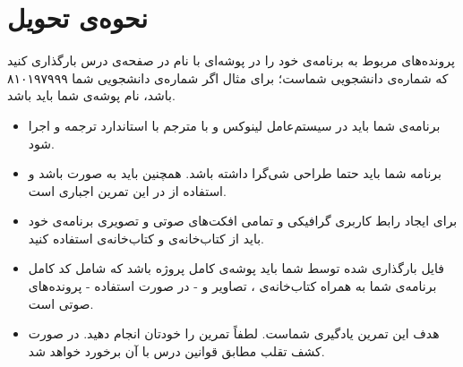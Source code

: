 \documentclass{utap}
\begin{document}
\section{نحوه‌ی تحویل}
    پرونده‌‌های مربوط به برنامه‌ی خود را در پوشه‌ای با نام  در صفحه‌ی  درس بارگذاری کنید که  شماره‌ی دانشجویی شماست؛ برای مثال اگر شماره‌ی دانشجویی شما ۸۱۰۱۹۷۹۹۹ باشد، نام پوشه‌ی شما باید  باشد.
    \begin{itemize}
        \item
برنامه‌ی شما باید در سیستم‌عامل لینوکس و با مترجم  با استاندارد  ترجمه و اجرا شود.
	\item
برنامه شما باید حتما طراحی شی‌گرا داشته باشد. همچنین باید به صورت  باشد و استفاده از  در این تمرین اجباری است.
	\item
برای ایجاد رابط کاربری گرافیکی و تمامی افکت‌های صوتی و تصویری برنامه‌ی خود باید از کتاب‌خانه‌ی  و کتاب‌خانه‌ی  استفاده کنید.
        \item
فایل بارگذاری شده توسط شما باید پوشه‌ی کامل پروژه باشد که شامل کد کامل برنامه‌ی شما به همراه کتاب‌خانه‌ی ، تصاویر و - در صورت استفاده - پرونده‌های صوتی است.
        \item
هدف این تمرین یادگیری شماست. لطفاً تمرین را خودتان انجام دهید. در صورت کشف تقلب مطابق قوانین درس با آن برخورد خواهد شد.
    \end{itemize}
\end{document}

